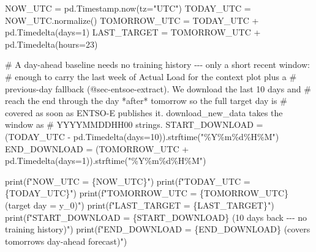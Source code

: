 \documentclass[
  english,
  letterpaper,
]{scrbook}
\newenvironment{Shaded}{\begin{snugshade}}{\end{snugshade}}
\newcommand{\BuiltInTok}[1]{\textcolor[rgb]{0.00,0.23,0.31}{#1}}
\newcommand{\CommentTok}[1]{\textcolor[rgb]{0.37,0.37,0.37}{#1}}
\newcommand{\DecValTok}[1]{\textcolor[rgb]{0.68,0.00,0.00}{#1}}
\newcommand{\NormalTok}[1]{\textcolor[rgb]{0.00,0.23,0.31}{#1}}
\newcommand{\OperatorTok}[1]{\textcolor[rgb]{0.37,0.37,0.37}{#1}}
\newcommand{\SpecialCharTok}[1]{\textcolor[rgb]{0.37,0.37,0.37}{#1}}
\newcommand{\SpecialStringTok}[1]{\textcolor[rgb]{0.13,0.47,0.30}{#1}}
\newcommand{\StringTok}[1]{\textcolor[rgb]{0.13,0.47,0.30}{#1}}
\begin{document}
\protect{}\label{entsoe-constants}
\begin{Shaded}
\begin{Highlighting}[]
\NormalTok{NOW\_UTC }\OperatorTok{=}\NormalTok{ pd.Timestamp.now(tz}\OperatorTok{=}\StringTok{"UTC"}\NormalTok{)}
\NormalTok{TODAY\_UTC }\OperatorTok{=}\NormalTok{ NOW\_UTC.normalize()}
\NormalTok{TOMORROW\_UTC }\OperatorTok{=}\NormalTok{ TODAY\_UTC }\OperatorTok{+}\NormalTok{ pd.Timedelta(days}\OperatorTok{=}\DecValTok{1}\NormalTok{)}
\NormalTok{LAST\_TARGET }\OperatorTok{=}\NormalTok{ TOMORROW\_UTC }\OperatorTok{+}\NormalTok{ pd.Timedelta(hours}\OperatorTok{=}\DecValTok{23}\NormalTok{)}

\CommentTok{\# A day{-}ahead baseline needs no training history {-}{-}{-} only a short recent window:}
\CommentTok{\# enough to carry the last week of \textasciigrave{}Actual Load\textasciigrave{} for the context plot plus a}
\CommentTok{\# previous{-}day fallback (@sec{-}entsoe{-}extract). We download the last 10 days and}
\CommentTok{\# reach the end through the day *after* tomorrow so the full target day is}
\CommentTok{\# covered as soon as ENTSO{-}E publishes it. download\_new\_data takes the window as}
\CommentTok{\# \textquotesingle{}YYYYMMDDHH00\textquotesingle{} strings.}
\NormalTok{START\_DOWNLOAD }\OperatorTok{=}\NormalTok{ (TODAY\_UTC }\OperatorTok{{-}}\NormalTok{ pd.Timedelta(days}\OperatorTok{=}\DecValTok{10}\NormalTok{)).strftime(}\StringTok{"\%Y\%m}\SpecialCharTok{\%d}\StringTok{\%H\%M"}\NormalTok{)}
\NormalTok{END\_DOWNLOAD }\OperatorTok{=}\NormalTok{ (TOMORROW\_UTC }\OperatorTok{+}\NormalTok{ pd.Timedelta(days}\OperatorTok{=}\DecValTok{1}\NormalTok{)).strftime(}\StringTok{"\%Y\%m}\SpecialCharTok{\%d}\StringTok{\%H\%M"}\NormalTok{)}

\BuiltInTok{print}\NormalTok{(}\SpecialStringTok{f"NOW\_UTC        = }\SpecialCharTok{\{}\NormalTok{NOW\_UTC}\SpecialCharTok{\}}\SpecialStringTok{"}\NormalTok{)}
\BuiltInTok{print}\NormalTok{(}\SpecialStringTok{f"TODAY\_UTC      = }\SpecialCharTok{\{}\NormalTok{TODAY\_UTC}\SpecialCharTok{\}}\SpecialStringTok{"}\NormalTok{)}
\BuiltInTok{print}\NormalTok{(}\SpecialStringTok{f"TOMORROW\_UTC   = }\SpecialCharTok{\{}\NormalTok{TOMORROW\_UTC}\SpecialCharTok{\}}\SpecialStringTok{  (target day = y\_0)"}\NormalTok{)}
\BuiltInTok{print}\NormalTok{(}\SpecialStringTok{f"LAST\_TARGET    = }\SpecialCharTok{\{}\NormalTok{LAST\_TARGET}\SpecialCharTok{\}}\SpecialStringTok{"}\NormalTok{)}
\BuiltInTok{print}\NormalTok{(}\SpecialStringTok{f"START\_DOWNLOAD = }\SpecialCharTok{\{}\NormalTok{START\_DOWNLOAD}\SpecialCharTok{\}}\SpecialStringTok{  (10 days back {-}{-}{-} no training history)"}\NormalTok{)}
\BuiltInTok{print}\NormalTok{(}\SpecialStringTok{f"END\_DOWNLOAD   = }\SpecialCharTok{\{}\NormalTok{END\_DOWNLOAD}\SpecialCharTok{\}}\SpecialStringTok{  (covers tomorrow\textquotesingle{}s day{-}ahead forecast)"}\NormalTok{)}
\end{Highlighting}
\end{Shaded}
\end{document}
